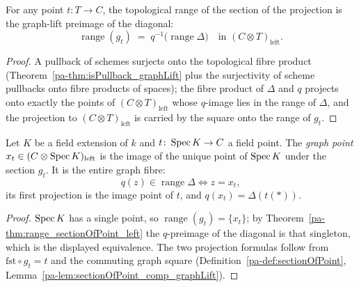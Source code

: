 \begin{theorem}
  \label{pa-thm:range_sectionOfPoint_left}
  \leanok

  For any point \(t \colon T \to C\), the topological range of the section of the
  projection is the graph-lift preimage of the diagonal:
  \[
    \operatorname{range}(g_t) \;=\; q^{-1}\bigl(\operatorname{range}\Delta\bigr)
    \quad\text{in } (C \otimes T)_{\mathrm{left}} .
  \]
\end{theorem}
\begin{proof}
  \leanok
  A pullback of schemes surjects onto the topological fibre product
  (Theorem~\ref{pa-thm:isPullback_graphLift} plus the surjectivity of scheme pullbacks onto
  fibre products of spaces); the fibre product of \(\Delta\) and \(q\) projects onto
  exactly the points of \((C \otimes T)_{\mathrm{left}}\) whose \(q\)-image lies in the
  range of \(\Delta\), and the projection to \((C \otimes T)_{\mathrm{left}}\) is carried
  by the square onto the range of \(g_t\).
\end{proof}

\begin{definition}
  \label{pa-def:graphPoint}
  \leanok

  Let \(K\) be a field extension of \(k\) and \(t \colon \operatorname{Spec} K \to C\) a field point. The
  \emph{graph point} \(x_t \in (C \otimes \operatorname{Spec} K)_{\mathrm{left}}\) is the image of the
  unique point of \(\operatorname{Spec} K\) under the section \(g_t\). It is the entire graph fibre:
  \[
    q(z) \in \operatorname{range}\Delta \iff z = x_t ,
  \]
  its first projection is the image point of \(t\), and \(q(x_t) = \Delta(t(\ast))\).
\end{definition}
\begin{proof}
  \leanok
  \(\operatorname{Spec} K\) has a single point, so
  \(\operatorname{range}(g_t) = \{x_t\}\); by
  Theorem~\ref{pa-thm:range_sectionOfPoint_left} the \(q\)-preimage of the diagonal is that
  singleton, which is the displayed equivalence. The two projection formulas follow from
  \(\mathrm{fst} \circ g_t = t\) and the commuting graph square
  (Definition~\ref{pa-def:sectionOfPoint},
  Lemma~\ref{pa-lem:sectionOfPoint_comp_graphLift}).
\end{proof}

